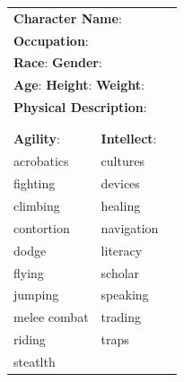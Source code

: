 \cleardoublepage
\begin{table}
\begin{tabular}{m{156pt} m{156pt} m{156pt}}
    \multicolumn{2}{l}{\textbf{Character Name}: \hrulefill} \\
    \multicolumn{2}{l}{\textbf{Occupation}: \hrulefill} \\
    \multicolumn{2}{l}{\textbf{Race}: \hrulefill \hspace{1em} \textbf{Gender}: \hrulefill} \\
    \multicolumn{2}{l}{\textbf{Age}: \hrulefill \hspace{1em} \textbf{Height}: \hrulefill \hspace{1em}  \textbf{Weight}: \hrulefill } \\
    \multicolumn{2}{l}{\textbf{Physical Description}: \hrulefill } \\
    \multicolumn{2}{l}{ \hrulefill } \\
 & & \\
\textbf{Agility}: \hrulefill      & \textbf{Intellect}: \hrulefill  &                             \\
acrobatics \hrulefill             & cultures \hrulefill             &                             \\
fighting \hrulefill               & devices \hrulefill              &                             \\
climbing \hrulefill               & healing \hrulefill              &                             \\
contortion \hrulefill             & navigation \hrulefill           &                             \\
dodge \hrulefill                  & literacy \hrulefill             &                             \\
flying \hrulefill                 & scholar \hrulefill              &                             \\
jumping \hrulefill                & speaking \hrulefill             &                             \\
melee combat \hrulefill           & trading \hrulefill              &                             \\
riding \hrulefill                 & traps \hrulefill                &                             \\
steatlth \hrulefill               & \hrulefill                      &                             \\

\end{tabular}
\end{table}
